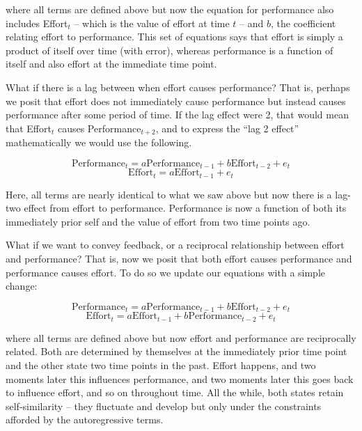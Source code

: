 \documentclass[english,,man]{apa6}
\theoremstyle{definition}
\theoremstyle{definition}
\theoremstyle{definition}
\theoremstyle{remark}
\begin{document}
\noindent where all terms are defined above but now the equation for
performance also includes Effort\(_t\) -- which is the value of effort
at time \(t\) -- and \(b\), the coefficient relating effort to
performance. This set of equations says that effort is simply a product
of itself over time (with error), whereas performance is a function of
itself and also effort at the immediate time point.

What if there is a lag between when effort causes performance? That is,
perhaps we posit that effort does not immediately cause performance but
instead causes performance after some period of time. If the lag effect
were 2, that would mean that Effort\(_t\) causes Performance\(_{t+2}\),
and to express the \enquote{lag 2 effect} mathematically we would use
the following.

\begin{equation}
\label{sysy3}
\textrm{Performance}_{t} = a \textrm{Performance}_{t - 1} + b \textrm{Effort}_{t - 2} + e_{t}
\end{equation} \begin{equation}
\label{sysx3}
\textrm{Effort}_{t} = a \textrm{Effort}_{t - 1} + e_{t}
\end{equation}

\noindent Here, all terms are nearly identical to what we saw above but
now there is a lag-two effect from effort to performance. Performance is
now a function of both its immediately prior self and the value of
effort from two time points ago.

What if we want to convey feedback, or a reciprocal relationship between
effort and performance? That is, now we posit that both effort causes
performance and performance causes effort. To do so we update our
equations with a simple change:

\begin{equation}
\label{sysy3}
\textrm{Performance}_{t} = a \textrm{Performance}_{t - 1} + b \textrm{Effort}_{t - 2} + e_{t}
\end{equation} \begin{equation}
\label{sysx3}
\textrm{Effort}_{t} = a \textrm{Effort}_{t - 1} + b \textrm{Performance}_{t - 2} + e_{t}
\end{equation}

\noindent where all terms are defined above but now effort and
performance are reciprocally related. Both are determined by themselves
at the immediately prior time point and the other state two time points
in the past. Effort happens, and two moments later this influences
performance, and two moments later this goes back to influence effort,
and so on throughout time. All the while, both states retain
self-similarity -- they fluctuate and develop but only under the
constraints afforded by the autoregressive terms.
\end{document}

